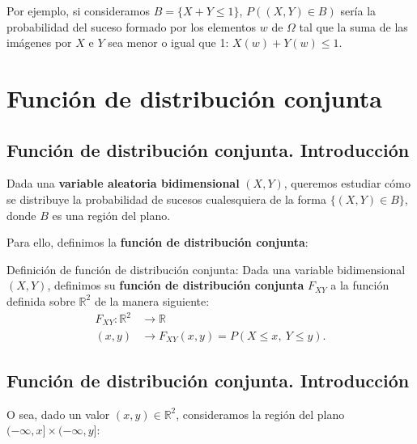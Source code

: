 \documentclass[]{book}
\begin{document}
Por ejemplo, si consideramos \(B=\{X+Y\leq 1\}\), \(P((X,Y)\in B)\) sería la probabilidad del suceso formado por los elementos \(w\) de \(\Omega\) tal que la suma de las imágenes por \(X\) e \(Y\) sea menor o igual que 1: \(X(w)+Y(w)\leq 1\).

\hypertarget{funciuxf3n-de-distribuciuxf3n-conjunta}{%
\section{Función de distribución conjunta}\label{funciuxf3n-de-distribuciuxf3n-conjunta}}

\hypertarget{funciuxf3n-de-distribuciuxf3n-conjunta.-introducciuxf3n}{%
\subsection{Función de distribución conjunta. Introducción}\label{funciuxf3n-de-distribuciuxf3n-conjunta.-introducciuxf3n}}

Dada una \textbf{variable aleatoria bidimensional} \((X,Y)\), queremos estudiar cómo se distribuye la probabilidad de sucesos cualesquiera de la forma \(\{(X,Y)\in B\}\), donde \(B\) es una región del plano.

Para ello, definimos la \textbf{función de distribución conjunta}:

Definición de función de distribución conjunta:
Dada una variable bidimensional \((X,Y)\), definimos su \textbf{función de distribución conjunta} \(F_{XY}\) a la función definida sobre \(\mathbb{R}^2\) de la manera siguiente:
\[
\begin{array}{rl}
F_{XY}: \mathbb{R}^2 & \longrightarrow \mathbb{R}\\
(x,y) & \longrightarrow F_{XY}(x,y)=P(X\leq x,\ Y\leq y).
\end{array}
\]

\hypertarget{funciuxf3n-de-distribuciuxf3n-conjunta.-introducciuxf3n-1}{%
\subsection{Función de distribución conjunta. Introducción}\label{funciuxf3n-de-distribuciuxf3n-conjunta.-introducciuxf3n-1}}

O sea, dado un valor \((x,y)\in \mathbb{R}^2\), consideramos la región del plano \((-\infty,x]\times (-\infty,y]\):
\end{document}
